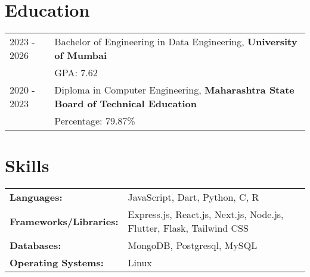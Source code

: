 \documentclass[a4paper,12pt]{article}
\begin{document}
\section{Education}
\begin{tabularx}{\linewidth}{@{}l X@{}}
2023 - 2026 & Bachelor of Engineering in Data Engineering, \textbf{University of Mumbai} \\
& \hfill GPA: 7.62\\
2020 - 2023 & Diploma in Computer Engineering, \textbf{Maharashtra State Board of Technical Education} \\
& \hfill Percentage: 79.87\%\\
\end{tabularx}

\section{Skills}
\begin{tabularx}{\linewidth}{@{}l X@{}}
\textbf{Languages:} & \normalsize{JavaScript, Dart, Python, C, R} \\
\textbf{Frameworks/Libraries:} & \normalsize{Express.js, React.js, Next.js, Node.js, Flutter, Flask, Tailwind CSS} \\
\textbf{Databases:} & \normalsize{MongoDB, Postgresql, MySQL} \\
\textbf{Operating Systems:} & \normalsize{Linux} \\
\end{tabularx}

\vfill
{}
\end{document}
